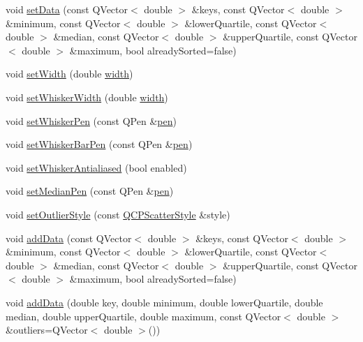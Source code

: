 \begin{DoxyCompactItemize}
void \mbox{\hyperlink{class_q_c_p_statistical_box_a4ae198e66243d8cc57ad8893c37bf9d4}{set\+Data}} (const Q\+Vector$<$ double $>$ \&keys, const Q\+Vector$<$ double $>$ \&minimum, const Q\+Vector$<$ double $>$ \&lower\+Quartile, const Q\+Vector$<$ double $>$ \&median, const Q\+Vector$<$ double $>$ \&upper\+Quartile, const Q\+Vector$<$ double $>$ \&maximum, bool already\+Sorted=false)
\item 
void \mbox{\hyperlink{class_q_c_p_statistical_box_a0b62775bd67301b1eba5c785f2b26f14}{set\+Width}} (double \mbox{\hyperlink{class_q_c_p_statistical_box_ae589b7481dec6ef8e50ebb6492d296f1}{width}})
\item 
void \mbox{\hyperlink{class_q_c_p_statistical_box_adf378812446bd66f34d1f7f293d991cd}{set\+Whisker\+Width}} (double \mbox{\hyperlink{class_q_c_p_statistical_box_ae589b7481dec6ef8e50ebb6492d296f1}{width}})
\item 
void \mbox{\hyperlink{class_q_c_p_statistical_box_a4a5034cb3b9b040444df05ab1684620b}{set\+Whisker\+Pen}} (const Q\+Pen \&\mbox{\hyperlink{class_q_c_p_abstract_plottable_ad5972efc31344e5a7a78ab4f8864b2d3}{pen}})
\item 
void \mbox{\hyperlink{class_q_c_p_statistical_box_aa8d3e503897788e1abf68dc74b5f147f}{set\+Whisker\+Bar\+Pen}} (const Q\+Pen \&\mbox{\hyperlink{class_q_c_p_abstract_plottable_ad5972efc31344e5a7a78ab4f8864b2d3}{pen}})
\item 
void \mbox{\hyperlink{class_q_c_p_statistical_box_a61bcd458fba002f72304d11319051843}{set\+Whisker\+Antialiased}} (bool enabled)
\item 
void \mbox{\hyperlink{class_q_c_p_statistical_box_a7260ac55b669f5d0a74f16d5ca84c52c}{set\+Median\+Pen}} (const Q\+Pen \&\mbox{\hyperlink{class_q_c_p_abstract_plottable_ad5972efc31344e5a7a78ab4f8864b2d3}{pen}})
\item 
void \mbox{\hyperlink{class_q_c_p_statistical_box_ad5241943422eb8e58360a97e99ad6aa7}{set\+Outlier\+Style}} (const \mbox{\hyperlink{class_q_c_p_scatter_style}{Q\+C\+P\+Scatter\+Style}} \&style)
\item 
void \mbox{\hyperlink{class_q_c_p_statistical_box_a9a8739c5b8291db8fd839e892fc8f478}{add\+Data}} (const Q\+Vector$<$ double $>$ \&keys, const Q\+Vector$<$ double $>$ \&minimum, const Q\+Vector$<$ double $>$ \&lower\+Quartile, const Q\+Vector$<$ double $>$ \&median, const Q\+Vector$<$ double $>$ \&upper\+Quartile, const Q\+Vector$<$ double $>$ \&maximum, bool already\+Sorted=false)
\item 
void \mbox{\hyperlink{class_q_c_p_statistical_box_a026f2790b530d6f29312254ecb1e7c1e}{add\+Data}} (double key, double minimum, double lower\+Quartile, double median, double upper\+Quartile, double maximum, const Q\+Vector$<$ double $>$ \&outliers=Q\+Vector$<$ double $>$())

\end{DoxyCompactItemize}
